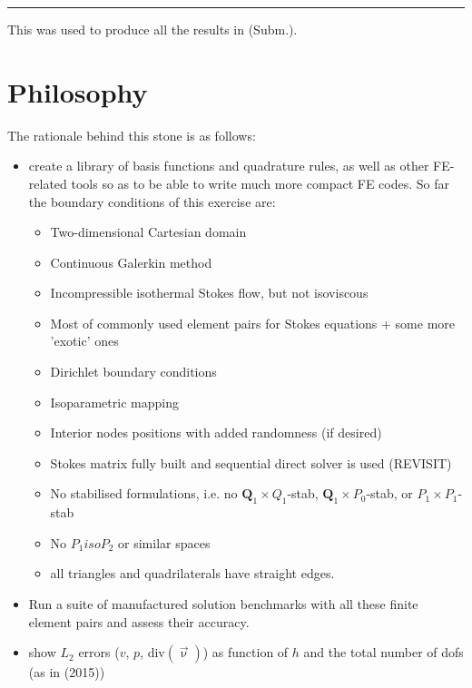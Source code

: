 \par\noindent\rule{\textwidth}{0.4pt}



This \stone was used to produce all the results in \textcite{thba24} (Subm.).

\section*{Philosophy}

The rationale behind this stone is as follows:
\begin{itemize}
\item create a library of basis functions and quadrature rules, as well as 
other FE-related tools so as to be able to write much more compact FE codes. 
So far the boundary conditions of this exercise are:
\begin{itemize}
\item Two-dimensional Cartesian domain
\item Continuous Galerkin method
\item Incompressible isothermal Stokes flow, but not isoviscous
\item Most of commonly used element pairs for Stokes equations + some more 'exotic' ones 
\item Dirichlet boundary conditions 
\item Isoparametric mapping 
\item Interior nodes positions with added randomness (if desired)
\item Stokes matrix fully built and sequential direct solver is used (REVISIT)
\item No stabilised formulations, i.e. no ${\bm Q}_1\times Q_1$-stab, 
      ${\bm Q}_1\times P_0$-stab, or $P_1\times P_1$-stab
\item No $P_1isoP_2$ or similar spaces
\item all triangles and quadrilaterals have straight edges.
\end{itemize}
\item Run a suite of manufactured solution benchmarks with all 
these finite element pairs and assess their accuracy.
\item show $L_2$ errors ($v$, $p$, div$(\vec\upnu)$) as function of $h$ and the 
total number of dofs (as in \textcite{cakp15} (2015))
\end{itemize}

